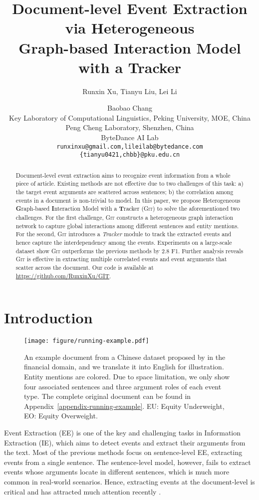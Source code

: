 \documentclass[11pt,a4paper]{article}
\title{Document-level Event Extraction via Heterogeneous \\ Graph-based Interaction Model with a Tracker}
\author{
  Runxin Xu, 
  Tianyu Liu, 
  Lei Li \and
  Baobao Chang\footnotemark[1]
  \\
  Key Laboratory of Computational Linguistics, Peking University, MOE, China\\
  Peng Cheng Laboratory, Shenzhen, China\\
  ByteDance AI Lab\\
  \texttt{
     runxinxu@gmail.com,lileilab@bytedance.com
  } \\
  \texttt{
     \{tianyu0421,chbb\}@pku.edu.cn
  }
}
\date{}
\newcommand{\modelname}{\textsc{Git}\xspace}
\begin{document}
\maketitle

\renewcommand{\thefootnote}{\fnsymbol{footnote}} 

\begin{abstract}

Document-level event extraction aims to recognize event information from a whole piece of article.
Existing methods are not effective due to two challenges of this task: a) the target event arguments are scattered across sentences; b) the correlation among events in a document is non-trivial to model.
In this paper, we propose Heterogeneous \textbf{G}raph-based \textbf{I}nteraction Model with a \textbf{T}racker (\modelname) to solve the aforementioned two challenges.
For the first challenge, \modelname constructs a heterogeneous graph interaction network to capture global interactions among different sentences and entity mentions.
For the second, \modelname introduces a \textit{Tracker} module to track the extracted events and hence capture the interdependency among the events.
Experiments on a large-scale dataset  \citep{zheng-etal-2019-doc2edag} show \modelname outperforms the previous methods by 2.8 F1.
Further analysis reveals \modelname is effective in extracting multiple correlated events and event arguments that scatter across the document.
Our code is available at \url{https://github.com/RunxinXu/GIT}.

\end{abstract} \section{Introduction}
\begin{figure}
    \centering
    \texttt{[image: figure/running-example.pdf]}
    \caption{An example document from a Chinese dataset proposed by \citet{zheng-etal-2019-doc2edag} in the financial domain, and we translate it into English for illustration. Entity mentions are colored. Due to space limitation, we only show four associated sentences and three argument roles of each event type. The complete original document can be found in Appendix~\ref{appendix-running-example}. EU: Equity Underweight, EO: Equity Overweight.}
    \label{fig:running-example}
\end{figure}

Event Extraction (EE) is one of the key and challenging tasks in Information Extraction (IE), which aims to detect events and extract their arguments from the text.
Most of the previous methods \citep{ chen-etal-2015-event, nguyen-etal-2016-joint, liu-etal-2018-jointly, yang-etal-2019-exploring-pre, du-cardie-2020-event} focus on sentence-level EE, extracting events from a single sentence.
The sentence-level model, however, fails to extract events whose arguments locate in different sentences, which is much more common in real-world scenarios.
Hence, extracting events at the document-level is critical and has attracted much attention recently \citep{yang-etal-2018-dcfee,zheng-etal-2019-doc2edag,du-cardie-2020-document, DBLP:journals/corr/abs-2008-09249}.
\end{document}
